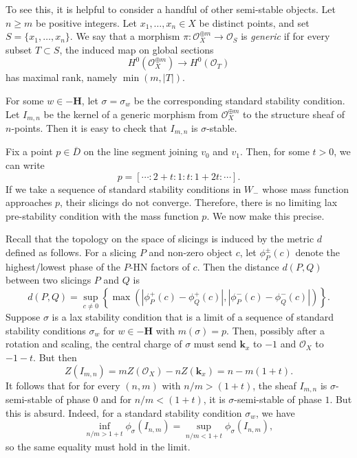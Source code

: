 \documentclass{amsart}
\begin{document}
To see this, it is helpful to consider a handful of other semi-stable objects.
Let \(n \geq m\) be positive integers.
Let \(x_1, \dots, x_n \in X\) be distinct points, and set \(S = \{x_1, \dots, x_n\}\).
We say that a morphism \( \pi \colon \mathcal{O}_X^{\oplus m} \to \mathcal{O}_S\) is \emph{generic} if for every subset \(T \subset S\), the induced map on global sections
\[ H^0(\mathcal{O}_X^{\oplus m}) \to H^0(\mathcal{O}_T)\]
has maximal rank, namely \(\min(m, |T|)\).

For some \(w \in -\mathbf{H}\), let \(\sigma = \sigma_w\) be the corresponding standard stability condition.
Let \(I_{m,n}\) be the kernel of a generic morphism from \(\mathcal{O}_X^{\oplus m}\) to the structure sheaf of \(n\)-points.
Then it is easy to check that \(I_{m,n}\) is \(\sigma\)-stable.

Fix a point \(p \in \overline D\) on the line segment joining \(v_0\) and \(v_1\).
Then, for some \(t > 0\), we can write
\[ p = [ \cdots : 2 + t: 1: t : 1+2t : \cdots].\]
If we take a sequence of standard stability conditions in \(W_{-}\) whose mass function approaches \(p\), their slicings do not converge.
Therefore, there is no limiting lax pre-stability condition with the mass function \(p\).
We now make this precise.

Recall that the topology on the space of slicings is induced by the metric \(d\) defined as follows.
For a slicing \(P\) and non-zero object \(c\), let \(\phi^{\pm}_P(c)\) denote the highest/lowest phase of the \(P\)-HN factors of \(c\).
Then the distance \(d(P,Q)\) between two slicings \(P\) and \(Q\) is
\[ d(P,Q) = \operatorname{sup}_{c \neq 0}\left\{ \max(|\phi_{P}^+(c) - \phi_{Q}^+(c)|, |\phi^-_P(c) - \phi^-_Q(c)|)\right\}.\]
Suppose \(\sigma\) is a lax stability condition that is a limit of a sequence of standard stability conditions \(\sigma_w\) for \(w \in -\mathbf{H}\) with \(m(\sigma) = p\).
Then, possibly after a rotation and scaling, the central charge of \(\sigma\) must send \(\mathbf{k}_x\) to \(-1\) and \(\mathcal{O}_X\) to \(-1-t\).
But then
\[ Z(I_{m,n}) = mZ(\mathcal{O}_X) - n Z(\mathbf{k}_x) = n - m(1+t).\]
It follows that for for every \((n,m)\) with \(n/m > (1+t)\), the sheaf \(I_{m,n}\) is \(\sigma\)-semi-stable of phase \(0\) and for \(n/m < (1+t)\), it is \(\sigma\)-semi-stable of phase \(1\).
But this is absurd.
Indeed, for a standard stability condition \(\sigma_w\), we have
\[ \inf_{n/m > 1+t} \phi_{\sigma}(I_{n,m}) = \sup_{n/m < 1+t} \phi_{\sigma}(I_{n,m}),\]
so the same equality must hold in the limit.
\end{document}
